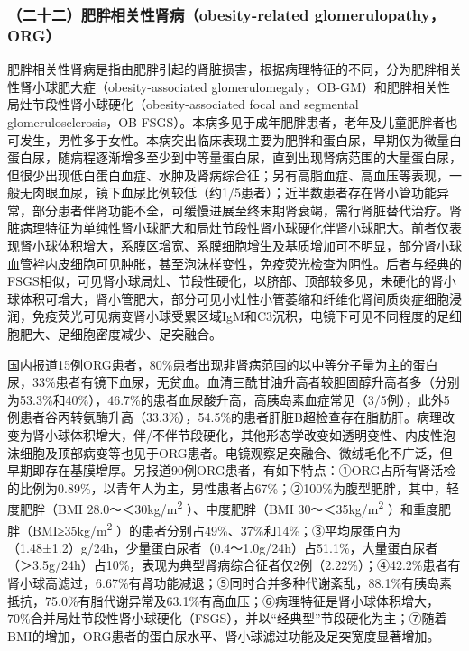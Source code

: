 \subsubsection{（二十二）肥胖相关性肾病（obesity-related glomerulopathy，ORG）}

肥胖相关性肾病是指由肥胖引起的肾脏损害，根据病理特征的不同，分为肥胖相关性肾小球肥大症（obesity-associated
glomerulomegaly，OB-GM）和肥胖相关性局灶节段性肾小球硬化（obesity-associated
focal and segmental
glomerulosclerosis，OB-FSGS）。本病多见于成年肥胖患者，老年及儿童肥胖者也可发生，男性多于女性。本病突出临床表现主要为肥胖和蛋白尿，早期仅为微量白蛋白尿，随病程逐渐增多至少到中等量蛋白尿，直到出现肾病范围的大量蛋白尿，但很少出现低白蛋白血症、水肿及肾病综合征；另有高脂血症、高血压等表现，一般无肉眼血尿，镜下血尿比例较低（约1/5患者）；近半数患者存在肾小管功能异常，部分患者伴肾功能不全，可缓慢进展至终末期肾衰竭，需行肾脏替代治疗。肾脏病理特征为单纯性肾小球肥大和局灶节段性肾小球硬化伴肾小球肥大。前者仅表现肾小球体积增大，系膜区增宽、系膜细胞增生及基质增加可不明显，部分肾小球血管袢内皮细胞可见肿胀，甚至泡沫样变性，免疫荧光检查为阴性。后者与经典的FSGS相似，可见肾小球局灶、节段性硬化，以脐部、顶部较多见，未硬化的肾小球体积可增大，肾小管肥大，部分可见小灶性小管萎缩和纤维化肾间质炎症细胞浸润，免疫荧光可见病变肾小球受累区域IgM和C3沉积，电镜下可见不同程度的足细胞肥大、足细胞密度减少、足突融合。

国内报道15例ORG患者，80\%患者出现非肾病范围的以中等分子量为主的蛋白尿，33\%患者有镜下血尿，无贫血。血清三酰甘油升高者较胆固醇升高者多（分别为53.3\%和40\%），46.7\%的患者血尿酸升高，高胰岛素血症常见（3/5例），此外5例患者谷丙转氨酶升高（33.3\%），54.5\%的患者肝脏B超检查存在脂肪肝。病理改变为肾小球体积增大，伴/不伴节段硬化，其他形态学改变如透明变性、内皮性泡沫细胞及顶部病变等也见于ORG患者。电镜观察足突融合、微绒毛化不广泛，但早期即存在基膜增厚。另报道90例ORG患者，有如下特点：①ORG占所有肾活检的比例为0.89\%，以青年人为主，男性患者占67\%；②100\%为腹型肥胖，其中，轻度肥胖（BMI
28.0～＜30kg/m\textsuperscript{2} ）、中度肥胖（BMI
30～＜35kg/m\textsuperscript{2}
）和重度肥胖（BMI≥35kg/m\textsuperscript{2}
）的患者分别占49\%、37\%和14\%；③平均尿蛋白为（1.48±1.2）g/24h，少量蛋白尿者（0.4～1.0g/24h）占51.1\%，大量蛋白尿者（＞3.5g/24h）占10\%，表现为典型肾病综合征者仅2例（2.22\%）；④42.2\%患者有肾小球高滤过，6.67\%有肾功能减退；⑤同时合并多种代谢紊乱，88.1\%有胰岛素抵抗，75.0\%有脂代谢异常及63.1\%有高血压；⑥病理特征是肾小球体积增大，70\%合并局灶节段性肾小球硬化（FSGS），并以“经典型”节段硬化为主；⑦随着BMI的增加，ORG患者的蛋白尿水平、肾小球滤过功能及足突宽度显著增加。


